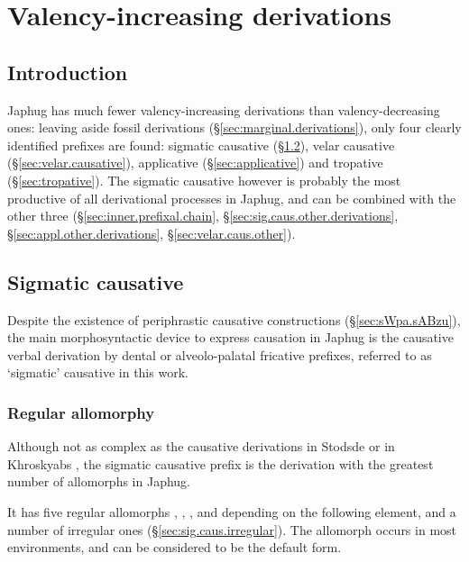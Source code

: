 \chapter{Valency-increasing derivations} \label{chap:valency.increasing.derivation}

\section{Introduction} 
Japhug has much fewer valency-increasing derivations than valency-decreasing ones: leaving aside fossil derivations (§\ref{sec:marginal.derivations}), only four clearly identified prefixes are found: sigmatic causative (§\ref{sec:sig.causative}), velar causative (§\ref{sec:velar.causative}), applicative (§\ref{sec:applicative}) and tropative (§\ref{sec:tropative}). The sigmatic causative however is probably the most productive of all derivational processes in Japhug,  and can be combined with the other three (§\ref{sec:inner.prefixal.chain}, §\ref{sec:sig.caus.other.derivations}, §\ref{sec:appl.other.derivations}, §\ref{sec:velar.caus.other}).
 

\section{Sigmatic causative} \label{sec:sig.causative}
Despite the existence of periphrastic causative constructions (§\ref{sec:sWpa.sABzu}), the main morphosyntactic device to express causation in Japhug is the causative verbal derivation by dental or alveolo-palatal fricative prefixes, referred to as `sigmatic' causative in this work.  

\subsection{Regular allomorphy} \label{sec:sig.caus.allomorphs}
 
Although not as complex as the causative derivations in Stodsde \citep{jackson07shangzhai} or in Khroskyabs \citep{lai16caus}, the sigmatic causative prefix is the derivation with the greatest number of allomorphs in Japhug.

It has five regular allomorphs , , ,  and  depending on the following element, and a number of irregular ones (§\ref{sec:sig.caus.irregular}). The allomorph  occurs in most environments, and can be considered to be the default form.


